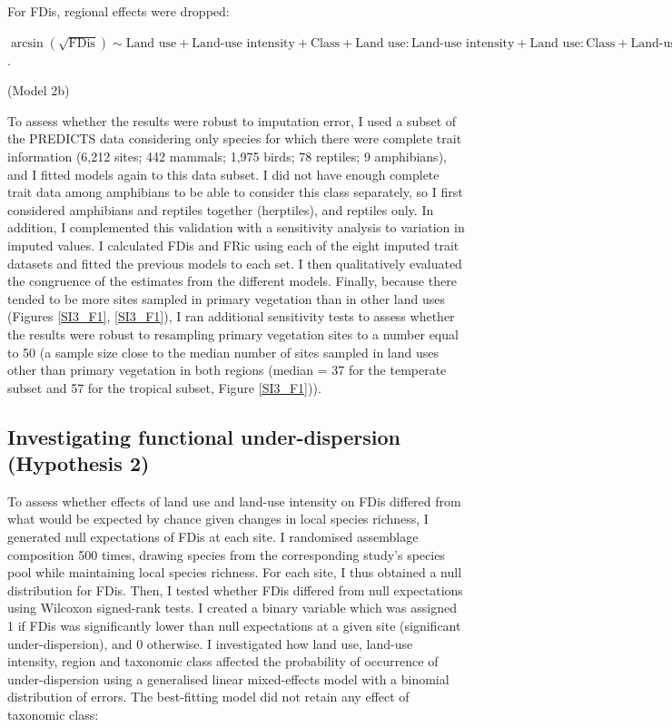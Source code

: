 For FDis, regional effects were dropped:
\begin{center}
$\arcsin(\sqrt{\text{FDis}})\sim \text{Land use} + \text{Land-use  intensity} + \text{Class} + \text{Land use}:\text{Land-use  intensity} + \text{Land use}:\text{Class} + \text{Land-use  intensity}:\text{Class}$.\\
\end{center}
\hspace*{\fill}(Model 2b)

To assess whether the results were robust to imputation error, I used a subset of the PREDICTS data considering only species for which there were complete trait information (6,212 sites; 442 mammals; 1,975 birds; 78 reptiles; 9 amphibians), and I fitted models again to this data subset. I did not have enough complete trait data among amphibians to be able to consider this class separately, so I first considered amphibians and reptiles together (herptiles), and reptiles only. In addition, I complemented this validation with a sensitivity analysis to variation in imputed values. I calculated FDis and FRic using each of the eight imputed trait datasets and fitted the previous models to each set. I then qualitatively evaluated the congruence of the estimates from the different models. Finally, because there tended to be more sites sampled in primary vegetation than in other land uses (Figures \ref{SI3_F1}, \ref{SI3_F1}), I ran additional sensitivity tests to assess whether the results were robust to resampling primary vegetation sites to a number equal to 50 (a sample size close to the median number of sites sampled in land uses other than primary vegetation in both regions (median = 37 for the temperate subset and 57 for the tropical subset, Figure \ref{SI3_F1})).


\subsection{Investigating functional under-dispersion (Hypothesis 2)}

To assess whether effects of land use and land-use  intensity on FDis differed from what would be expected by chance given changes in local species richness, I generated null expectations of FDis at each site. I randomised assemblage composition 500 times, drawing species from the corresponding study's species pool while maintaining local species richness. For each site, I thus obtained a null distribution for FDis. Then, I tested whether FDis differed from null expectations using Wilcoxon signed-rank tests. I created a binary variable which was assigned 1 if FDis was significantly lower than null expectations at a given site (significant under-dispersion), and 0 otherwise. I investigated how land use, land-use intensity, region and taxonomic class affected the probability of occurrence of under-dispersion using a generalised linear mixed-effects model with a binomial distribution of errors. The best-fitting model did not retain any effect of taxonomic class:

